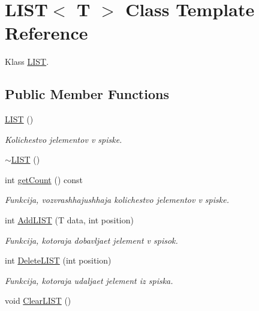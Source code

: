 \hypertarget{class_l_i_s_t}{}\section{L\+I\+S\+T$<$ T $>$ Class Template Reference}
\label{class_l_i_s_t}


Klass \hyperlink{class_l_i_s_t}{L\+I\+S\+T}.  


\subsection*{Public Member Functions}
\begin{DoxyCompactItemize}
\item 
\hypertarget{class_l_i_s_t_a5d034cd7e4284df353cb0319befc52a4}{}\hyperlink{class_l_i_s_t_a5d034cd7e4284df353cb0319befc52a4}{L\+I\+S\+T} ()\label{class_l_i_s_t_a5d034cd7e4284df353cb0319befc52a4}

\begin{DoxyCompactList}\small\item\em Kolichestvo jelementov v spiske. \end{DoxyCompactList}\item 
\hyperlink{class_l_i_s_t_a4ff667361292e9451ec4f7e36aed5805}{$\sim$\+L\+I\+S\+T} ()
\item 
\hypertarget{class_l_i_s_t_ad9c4d246b988b1f5405a1a09546e1423}{}int \hyperlink{class_l_i_s_t_ad9c4d246b988b1f5405a1a09546e1423}{get\+Count} () const \label{class_l_i_s_t_ad9c4d246b988b1f5405a1a09546e1423}

\begin{DoxyCompactList}\small\item\em Funkcija, vozvrashhajushhaja kolichestvo jelementov v spiske. \end{DoxyCompactList}\item 
int \hyperlink{class_l_i_s_t_ab30726ded81f85b96fd5aa4792916b2c}{Add\+L\+I\+S\+T} (T data, int position)
\begin{DoxyCompactList}\small\item\em Funkcija, kotoraja dobavljaet jelement v spisok. \end{DoxyCompactList}\item 
int \hyperlink{class_l_i_s_t_a3e7a1a3f1d58cf4c7900e3683cafc73f}{Delete\+L\+I\+S\+T} (int position)
\begin{DoxyCompactList}\small\item\em Funkcija, kotoraja udaljaet jelement iz spiska. \end{DoxyCompactList}\item 
\hypertarget{class_l_i_s_t_a2e42298655641db32dbe6a9a3744f2e6}{}void \hyperlink{class_l_i_s_t_a2e42298655641db32dbe6a9a3744f2e6}{Clear\+L\+I\+S\+T} ()\label{class_l_i_s_t_a2e42298655641db32dbe6a9a3744f2e6}


\end{DoxyCompactItemize}
